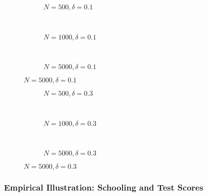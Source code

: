 \documentclass{beamer}
\begin{document}
\begin{frame}
\begin{figure}[h]
  \scriptsize
  \begingroup
  \centering
  \begin{subfigure}[b]{0.31\textwidth}
\caption{\footnotesize $N=500, \delta = 0.1$}
  
  \end{subfigure}
  ~
  \begin{subfigure}[b]{0.31\textwidth}
    \caption{\footnotesize $N=1000, \delta = 0.1$} 
  
  \end{subfigure}
  ~
  \begin{subfigure}[b]{0.31\textwidth}
\caption{\footnotesize $N=5000, \delta = 0.1$}
  
  \end{subfigure}
\endgroup
\end{figure}
\end{frame}

%  
%  
%  
\begin{frame}
\begin{figure}[h]
  \scriptsize
  \begingroup
  \centering
  \begin{subfigure}[b]{0.31\textwidth}
\caption{\footnotesize $N=500, \delta = 0.3$}
  
  \end{subfigure}
  ~
  \begin{subfigure}[b]{0.31\textwidth}
    \caption{\footnotesize $N=1000, \delta = 0.3$} 
  
  \end{subfigure}
 ~ 
  \begin{subfigure}[b]{0.31\textwidth}
\caption{\footnotesize $N=5000, \delta = 0.3$}
  
  \end{subfigure}
\endgroup
\end{figure}
\end{frame}
\begin{frame}
  \frametitle{Empirical Illustration: Schooling and Test Scores}
\end{frame}
\end{document}
